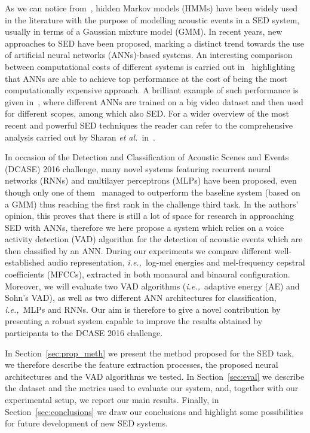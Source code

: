 As we can notice from~\cite{heittola2010audio, peng2009healthcare}, hidden Markov models (HMMs) have been widely used in the literature with the purpose of modelling acoustic events in a SED system, usually in terms of a Gaussian mixture model (GMM). In recent years, new approaches to SED have been proposed, marking a distinct trend towards the use of artificial neural networks (ANNs)-based systems. An interesting comparison between computational costs of different systems is carried out in~\cite{sigtia2016automatic} highlighting that ANNs are able to achieve top performance at the cost of being the most computationally expensive approach. A brilliant example of such performance is given in~\cite{hershey2016cnn}, where different ANNs are trained on a big video dataset and then used for different scopes, among which also SED. For a wider overview of the most recent and powerful SED techniques the reader can refer to the comprehensive analysis carried out by Sharan \emph{et al.}\ in~\cite{sharan2016overview}.

In occasion of the Detection and Classification of Acoustic Scenes and Events (DCASE) 2016 challenge, many novel systems featuring recurrent neural networks (RNNs) and multilayer perceptrons (MLPs) have been proposed, even though only one of them~\cite{adavanne2016sound} managed to outperform the baseline system (based on a GMM) thus reaching the first rank in the challenge third task. In the authors' opinion, this proves that there is still a lot of space for research in approaching SED with ANNs, therefore we here propose a system which relies on a voice activity detection (VAD) algorithm for the detection of acoustic events which are then classified by an ANN. During our experiments we compare different well-established audio representation, \emph{i.e.,}\ log-mel energies and mel-frequency cepstral coefficients (MFCCs), extracted in both monaural and binaural configuration. Moreover, we will evaluate two VAD algorithms (\emph{i.e.,}\ adaptive energy (AE) and Sohn's VAD), as well as two different ANN architectures for classification, \emph{i.e.,}\ MLPs and RNNs. Our aim is therefore to give a novel contribution by presenting a robust system capable to improve the results obtained by participants to the DCASE 2016 challenge.

In Section~\ref{sec:prop_meth} we present the method proposed for the SED task, we therefore describe the feature extraction processes, the proposed neural architectures and the VAD algorithms we tested. In Section~\ref{sec:eval} we describe the dataset and the metrics used to evaluate our system, and, together with our experimental setup, we report our main results. Finally, in Section~\ref{sec:conclusions} we draw our conclusions and highlight some possibilities for future development of new SED systems.

